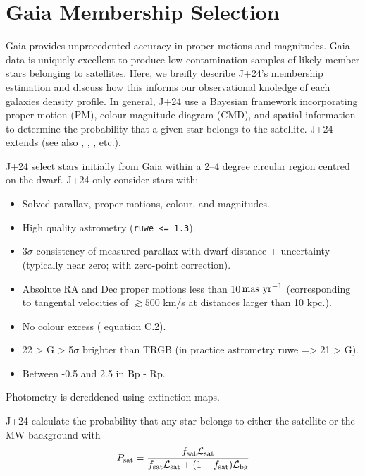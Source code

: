 \section{Gaia Membership Selection}\label{gaia-membership-selection}

Gaia provides unprecedented accuracy in proper motions and magnitudes.
Gaia data is uniquely excellent to produce low-contamination samples of
likely member stars belonging to satellites. Here, we breifly describe
J+24's membership estimation and discuss how this informs our
observational knoledge of each galaxies density profile. In general,
J+24 use a Bayesian framework incorporating proper motion (PM),
colour-magnitude diagram (CMD), and spatial information to determine the
probability that a given star belongs to the satellite. J+24 extends
\citet{MV2020a} (see also \citet{pace+li2019}, \citet{battaglia+2022},
\citet{pace+erkal+li2022}, etc.).

J+24 select stars initially from Gaia within a 2--4 degree circular
region centred on the dwarf. J+24 only consider stars with:

\begin{itemize}
\tightlist
\item
  Solved parallax, proper motions, colour, and magnitudes.
\item
  High quality astrometry (\texttt{ruwe\ \textless{}=\ 1.3}).
\item
  3\(\sigma\) consistency of measured parallax with dwarf distance +
  uncertainty (typically near zero; with \citet{lindegren+2018}
  zero-point correction).
\item
  Absolute RA and Dec proper motions less than
  10\(\,{\rm mas\ yr^{-1}}\) (corresponding to tangental velocities of
  \(\gtrsim 500\) km/s at distances larger than 10 kpc.).
\item
  No colour excess (\citet{lindegren+2018} equation C.2).
\item
  22 \textgreater{} G \textgreater{} 5\(\sigma\) brighter than TRGB (in
  practice astrometry ruwe =\textgreater{} 21 \textgreater{} G).
\item
  Between -0.5 and 2.5 in Bp - Rp.
\end{itemize}

Photometry is dereddened using \citet{schlegel+1988} extinction maps.

J+24 calculate the probability that any star belongs to either the
satellite or the MW background with \[
P_{\rm sat} = \frac{f_{\rm sat}{\cal L}_{\rm sat}}{f_{\rm sat}{\cal L}_{\rm sat} + (1-f_{\rm sat}){\cal L}_{\rm bg}}
\]

